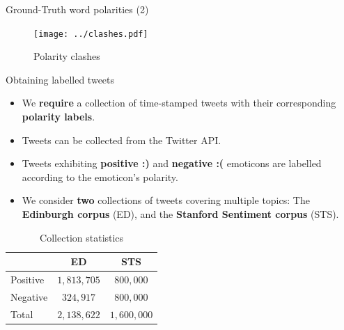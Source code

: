 \documentclass[handout]{beamer}
\begin{document}
\begin{frame}{Ground-Truth word polarities (2)}
\begin{scriptsize}
\begin{figure}[ht]
	\centering
	\texttt{[image: ../clashes.pdf]}
	\caption{Polarity clashes}
	\label{fig:word_clash}
\end{figure}
\end{scriptsize}
\end{frame}




\begin{frame}{Obtaining labelled tweets}
\begin{scriptsize}
\begin{itemize}
\item We \textbf{require} a collection of time-stamped tweets with their corresponding \textbf{polarity labels}. 
\item Tweets can be collected from the Twitter API.
\item Tweets exhibiting \textbf{positive :)} and \textbf{negative :(} emoticons are labelled according to the emoticon's polarity.
\item We consider \textbf{two}  collections of tweets covering multiple topics: The \textbf{Edinburgh corpus} (ED), and the \textbf{Stanford Sentiment corpus} (STS).
\end{itemize}

\begin{table}[htbp]
\begin{center}
\begin{tabular}{l|c|c}
\hline
 & ED & STS \\ \hline
Positive & $1,813,705$ & $800,000$  \\ 
Negative & $324,917$ & $800,000$  \\ \hline
Total & $2,138,622$ & $1,600,000$ \\ 
\end{tabular}
\end{center}
\caption{Collection statistics}
\label{tab:colstats}
\end{table}
\end{scriptsize}

\end{frame}
\end{document}
